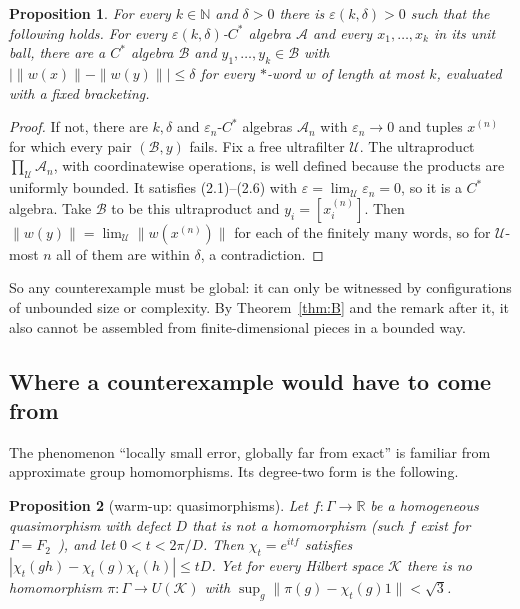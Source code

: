 \documentclass[11pt]{article}
\newtheorem{proposition}{Proposition}[section]
\theoremstyle{remark}
\newcommand{\eps}{\varepsilon}
\newcommand{\cA}{\mathcal{A}}
\newcommand{\cB}{\mathcal{B}}
\begin{document}
\begin{proposition}\label{prop:local}
For every $k\in\mathbb{N}$ and $\delta>0$ there is $\eps(k,\delta)>0$ such that the following holds. For every $\eps(k,\delta)$-$C^*$ algebra $\cA$ and every $x_1,\dots,x_k$ in its unit ball, there are a $C^*$ algebra $\cB$ and $y_1,\dots,y_k\in\cB$ with $|\|w(x)\|-\|w(y)\||\le\delta$ for every $*$-word $w$ of length at most $k$, evaluated with a fixed bracketing.
\end{proposition}

\begin{proof}
If not, there are $k,\delta$ and $\eps_n$-$C^*$ algebras $\cA_n$ with $\eps_n\to0$ and tuples $x^{(n)}$ for which every pair $(\cB,y)$ fails. Fix a free ultrafilter $\mathcal{U}$. The ultraproduct $\prod_\mathcal{U}\cA_n$, with coordinatewise operations, is well defined because the products are uniformly bounded. It satisfies (2.1)--(2.6) with $\eps=\lim_\mathcal{U}\eps_n=0$, so it is a $C^*$ algebra. Take $\cB$ to be this ultraproduct and $y_i=[x_i^{(n)}]$. Then $\|w(y)\|=\lim_\mathcal{U}\|w(x^{(n)})\|$ for each of the finitely many words, so for $\mathcal{U}$-most $n$ all of them are within $\delta$, a contradiction.
\end{proof}

So any counterexample must be global: it can only be witnessed by configurations of unbounded size or complexity. By Theorem~\ref{thm:B} and the remark after it, it also cannot be assembled from finite-dimensional pieces in a bounded way.

\subsection{Where a counterexample would have to come from}

The phenomenon ``locally small error, globally far from exact'' is familiar from approximate group homomorphisms. Its degree-two form is the following.

\begin{proposition}[warm-up: quasimorphisms]\label{prop:qm}
Let $f\colon\Gamma\to\mathbb{R}$ be a homogeneous quasimorphism with defect $D$ that is not a homomorphism (such $f$ exist for $\Gamma=F_2$~\cite{Brooks}), and let $0<t<2\pi/D$. Then $\chi_t=e^{itf}$ satisfies $|\chi_t(gh)-\chi_t(g)\chi_t(h)|\le tD$. Yet for every Hilbert space $\mathcal{K}$ there is no homomorphism $\pi\colon\Gamma\to U(\mathcal{K})$ with $\sup_g\|\pi(g)-\chi_t(g)1\|<\sqrt3$.
\end{proposition}
\end{document}
